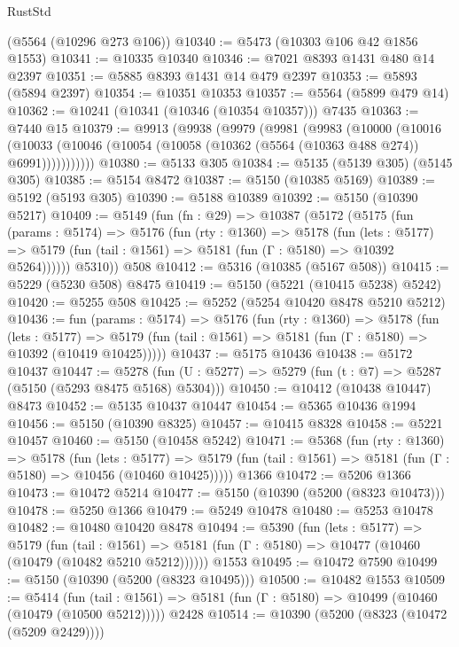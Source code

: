 \begin{lexlean}{RustStd}
\begin{coremodule}
    (@5564 (@10296 @273 @106))
@10340 := @5473 (@10303 @106 @42 @1856 @1553)
@10341 := @10335 @10340
@10346 := @7021 @8393 @1431 @480 @14 @2397
@10351 := @5885 @8393 @1431 @14 @479 @2397
@10353 := @5893 (@5894 @2397)
@10354 := @10351 @10353
@10357 := @5564 (@5899 @479 @14)
@10362 := @10241 (@10341 (@10346 (@10354 @10357))) @7435
@10363 := @7440 @15
@10379 := @9913
    (@9938
      (@9979
        (@9981
          (@9983
            (@10000
              (@10016
                (@10033 (@10046 (@10054 (@10058 (@10362 (@5564 (@10363 @488 @274)) @6991)))))))))))
@10380 := @5133 @305
@10384 := @5135 (@5139 @305) (@5145 @305)
@10385 := @5154 @8472
@10387 := @5150 (@10385 @5169)
@10389 := @5192 (@5193 @305)
@10390 := @5188 @10389
@10392 := @5150 (@10390 @5217)
@10409 := @5149
    (fun (fn : @29) =>
    @10387
      (@5172
        (@5175
          (fun (params : @5174) =>
          @5176
            (fun (rty : @1360) =>
            @5178
              (fun (lets : @5177) =>
              @5179 (fun (tail : @1561) => @5181 (fun (Γ : @5180) => @10392 @5264))))))
        @5310))
    @508
@10412 := @5316 (@10385 (@5167 @508))
@10415 := @5229 (@5230 @508) @8475
@10419 := @5150 (@5221 (@10415 @5238) @5242)
@10420 := @5255 @508
@10425 := @5252 (@5254 @10420 @8478 @5210 @5212)
@10436 := fun (params : @5174) =>
  @5176
    (fun (rty : @1360) =>
    @5178
      (fun (lets : @5177) =>
      @5179 (fun (tail : @1561) => @5181 (fun (Γ : @5180) => @10392 (@10419 @10425)))))
@10437 := @5175 @10436
@10438 := @5172 @10437
@10447 := @5278 (fun (U : @5277) => @5279 (fun (t : @7) => @5287 (@5150 (@5293 @8475 @5168) @5304)))
@10450 := @10412 (@10438 @10447) @8473
@10452 := @5135 @10437 @10447
@10454 := @5365 @10436 @1994
@10456 := @5150 (@10390 @8325)
@10457 := @10415 @8328
@10458 := @5221 @10457
@10460 := @5150 (@10458 @5242)
@10471 := @5368
    (fun (rty : @1360) =>
    @5178
      (fun (lets : @5177) =>
      @5179 (fun (tail : @1561) => @5181 (fun (Γ : @5180) => @10456 (@10460 @10425)))))
    @1366
@10472 := @5206 @1366
@10473 := @10472 @5214
@10477 := @5150 (@10390 (@5200 (@8323 @10473)))
@10478 := @5250 @1366
@10479 := @5249 @10478
@10480 := @5253 @10478
@10482 := @10480 @10420 @8478
@10494 := @5390
    (fun (lets : @5177) =>
    @5179
      (fun (tail : @1561) =>
      @5181 (fun (Γ : @5180) => @10477 (@10460 (@10479 (@10482 @5210 @5212))))))
    @1553
@10495 := @10472 @7590
@10499 := @5150 (@10390 (@5200 (@8323 @10495)))
@10500 := @10482 @1553
@10509 := @5414
    (fun (tail : @1561) => @5181 (fun (Γ : @5180) => @10499 (@10460 (@10479 (@10500 @5212)))))
    @2428
@10514 := @10390 (@5200 (@8323 (@10472 (@5209 @2429))))

\end{coremodule}
\end{lexlean}
